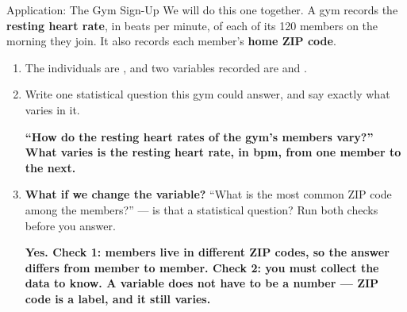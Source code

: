 \documentclass[12pt]{article}
\newcommand{\answerspace}[2]{\par\nopagebreak\noindent\begin{minipage}[t][#1][t]{\linewidth}%
  \color{keyred}\bfseries #2\end{minipage}\par}
\begin{document}
\boxguard[14]
\begin{notesbox}{Application: The Gym Sign-Up}
We will do this one together. A gym records the \textbf{resting heart rate}, in beats per
minute, of each of its 120 members on the morning they join. It also records each member's
\textbf{home ZIP code}.

\begin{enumerate}[label=\textbf{\alph*.}, leftmargin=1.8em, itemsep=7pt]
  \item The individuals are , and two variables recorded are
         and .
  \item Write one statistical question this gym could answer, and say exactly what varies in it.
        \answerspace{1.8cm}{``How do the resting heart rates of the gym's members vary?''
        What varies is the resting heart rate, in bpm, from one member to the next.}
  \item \textbf{What if we change the variable?} ``What is the most common ZIP code among the
        members?'' --- is that a statistical question? Run both checks before you answer.
        \answerspace{2.2cm}{Yes. Check 1: members live in different ZIP codes, so the answer
        differs from member to member. Check 2: you must collect the data to know. A variable
        does not have to be a number --- ZIP code is a label, and it still varies.}
\end{enumerate}
\end{notesbox}
\end{document}
